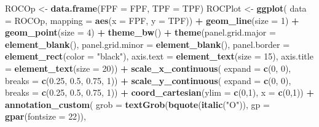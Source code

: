 \documentclass[
]{book}
\newenvironment{Shaded}{\begin{snugshade}}{\end{snugshade}}
\newcommand{\DataTypeTok}[1]{\textcolor[rgb]{0.13,0.29,0.53}{#1}}
\newcommand{\DecValTok}[1]{\textcolor[rgb]{0.00,0.00,0.81}{#1}}
\newcommand{\FloatTok}[1]{\textcolor[rgb]{0.00,0.00,0.81}{#1}}
\newcommand{\KeywordTok}[1]{\textcolor[rgb]{0.13,0.29,0.53}{\textbf{#1}}}
\newcommand{\NormalTok}[1]{#1}
\newcommand{\OperatorTok}[1]{\textcolor[rgb]{0.81,0.36,0.00}{\textbf{#1}}}
\newcommand{\StringTok}[1]{\textcolor[rgb]{0.31,0.60,0.02}{#1}}
\begin{document}
\begin{Shaded}
\begin{Highlighting}[]
\NormalTok{ROCOp <-}\StringTok{ }\KeywordTok{data.frame}\NormalTok{(}\DataTypeTok{FPF =}\NormalTok{ FPF, }\DataTypeTok{TPF =}\NormalTok{ TPF)}
\NormalTok{ROCPlot <-}\StringTok{ }\KeywordTok{ggplot}\NormalTok{(}
  \DataTypeTok{data =}\NormalTok{ ROCOp, }
  \DataTypeTok{mapping =} \KeywordTok{aes}\NormalTok{(}\DataTypeTok{x =}\NormalTok{ FPF, }\DataTypeTok{y =}\NormalTok{ TPF)) }\OperatorTok{+}\StringTok{ }
\StringTok{  }\KeywordTok{geom_line}\NormalTok{(}\DataTypeTok{size =} \DecValTok{1}\NormalTok{) }\OperatorTok{+}\StringTok{ }
\StringTok{  }\KeywordTok{geom_point}\NormalTok{(}\DataTypeTok{size =} \DecValTok{4}\NormalTok{) }\OperatorTok{+}\StringTok{ }
\StringTok{  }\KeywordTok{theme_bw}\NormalTok{() }\OperatorTok{+}\StringTok{ }
\StringTok{  }\KeywordTok{theme}\NormalTok{(}\DataTypeTok{panel.grid.major =} \KeywordTok{element_blank}\NormalTok{(), }
        \DataTypeTok{panel.grid.minor =} \KeywordTok{element_blank}\NormalTok{(), }
        \DataTypeTok{panel.border =} \KeywordTok{element_rect}\NormalTok{(}\DataTypeTok{color =} \StringTok{"black"}\NormalTok{), }
        \DataTypeTok{axis.text =} \KeywordTok{element_text}\NormalTok{(}\DataTypeTok{size =} \DecValTok{15}\NormalTok{), }
        \DataTypeTok{axis.title =} \KeywordTok{element_text}\NormalTok{(}\DataTypeTok{size =} \DecValTok{20}\NormalTok{)) }\OperatorTok{+}
\StringTok{  }\KeywordTok{scale_x_continuous}\NormalTok{(}
    \DataTypeTok{expand =} \KeywordTok{c}\NormalTok{(}\DecValTok{0}\NormalTok{, }\DecValTok{0}\NormalTok{), }
    \DataTypeTok{breaks =} \KeywordTok{c}\NormalTok{(}\FloatTok{0.25}\NormalTok{, }\FloatTok{0.5}\NormalTok{, }\FloatTok{0.75}\NormalTok{, }\DecValTok{1}\NormalTok{)) }\OperatorTok{+}\StringTok{ }
\StringTok{  }\KeywordTok{scale_y_continuous}\NormalTok{(}
    \DataTypeTok{expand =} \KeywordTok{c}\NormalTok{(}\DecValTok{0}\NormalTok{, }\DecValTok{0}\NormalTok{), }\DataTypeTok{breaks =} \KeywordTok{c}\NormalTok{(}\FloatTok{0.25}\NormalTok{, }\FloatTok{0.5}\NormalTok{, }\FloatTok{0.75}\NormalTok{, }\DecValTok{1}\NormalTok{)) }\OperatorTok{+}
\StringTok{  }\KeywordTok{coord_cartesian}\NormalTok{(}\DataTypeTok{ylim =} \KeywordTok{c}\NormalTok{(}\DecValTok{0}\NormalTok{,}\DecValTok{1}\NormalTok{), }\DataTypeTok{x =} \KeywordTok{c}\NormalTok{(}\DecValTok{0}\NormalTok{,}\DecValTok{1}\NormalTok{)) }\OperatorTok{+}\StringTok{ }
\StringTok{  }\KeywordTok{annotation_custom}\NormalTok{(}
    \DataTypeTok{grob =} \KeywordTok{textGrob}\NormalTok{(}\KeywordTok{bquote}\NormalTok{(}\KeywordTok{italic}\NormalTok{(}\StringTok{"O"}\NormalTok{)),}
                    \DataTypeTok{gp =} \KeywordTok{gpar}\NormalTok{(}\DataTypeTok{fontsize =} \DecValTok{22}\NormalTok{)), }

\end{Highlighting}
\end{Shaded}
\end{document}
